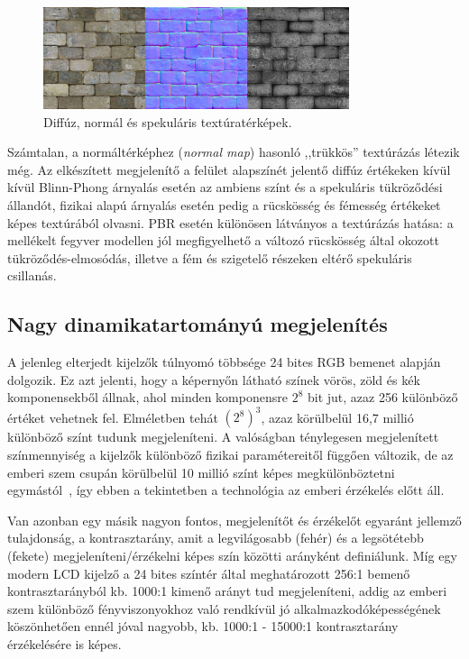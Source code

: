 \begin{figure}[!ht]
    \centering
    \includegraphics[width=0.8\textwidth]{images/brick_texture_maps.png}
    \caption{Diffúz, normál és spekuláris textúratérképek.}
\end{figure}

Számtalan, a normáltérképhez (\textit{normal map}) hasonló ,,trükkös'' textúrázás létezik még. Az elkészített megjelenítő a felület alapszínét jelentő diffúz értékeken kívül kívül Blinn-Phong árnyalás esetén az ambiens színt és a spekuláris tükröződési állandót, fizikai alapú árnyalás esetén pedig a rücskösség és fémesség értékeket képes textúrából olvasni. PBR esetén különösen látványos a textúrázás hatása: a mellékelt fegyver modellen jól megfigyelhető a változó rücskösség által okozott tükröződés-elmosódás, illetve a fém és szigetelő részeken eltérő spekuláris csillanás.

\subsection{Nagy dinamikatartományú megjelenítés}

A jelenleg elterjedt kijelzők túlnyomó többsége 24 bites RGB bemenet alapján dolgozik. Ez azt jelenti, hogy a képernyőn látható színek vörös, zöld és kék komponensekből állnak, ahol minden komponensre \(2^8\) bit jut, azaz 256 különböző értéket vehetnek fel. Elméletben tehát \((2^8)^3\), azaz körülbelül 16,7 millió különböző színt tudunk megjeleníteni. A valóságban ténylegesen megjelenített színmennyiség a kijelzők különböző fizikai paramétereitől függően változik, de az emberi szem csupán körülbelül 10 millió színt képes megkülönböztetni egymástól~\cite{judd1975color}, így ebben a tekintetben a technológia az emberi érzékelés előtt áll.

Van azonban egy másik nagyon fontos, megjelenítőt és érzékelőt egyaránt jellemző tulajdonság, a kontrasztarány, amit a legvilágosabb (fehér) és a legsötétebb (fekete) megjeleníteni/érzékelni képes szín közötti arányként definiálunk. Míg egy modern LCD kijelző a 24 bites színtér által meghatározott 256:1 bemenő kontrasztarányból kb. 1000:1 kimenő arányt tud megjeleníteni, addig az emberi szem különböző fényviszonyokhoz való rendkívül jó alkalmazkodóképességének köszönhetően ennél jóval nagyobb, kb. 1000:1 - 15000:1 kontrasztarány érzékelésére is képes.~\cite{human_eye_dynamic_range}

